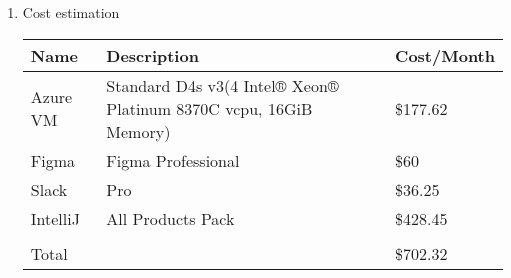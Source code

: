 \begin{enumerate}[label=\arabic*]
    \item Cost estimation
        \begin{table}[H]
            \center
            \begin{tabular}{m{1.4cm} m{4.1cm} m{1.4cm}}
                \toprule
                Name & Description & Cost/Month\\
                \midrule
                Azure VM & Standard D4s v3(4 Intel® Xeon® Platinum 8370C vcpu, 16GiB Memory) & \$177.62\\
                Figma & Figma Professional & \$60\\
                Slack & Pro & \$36.25\\
                IntelliJ & All Products Pack & \$428.45\\
                \bottomrule\\
                Total & & \$702.32\\
            \end{tabular}
        \end{table}
\end{enumerate}
